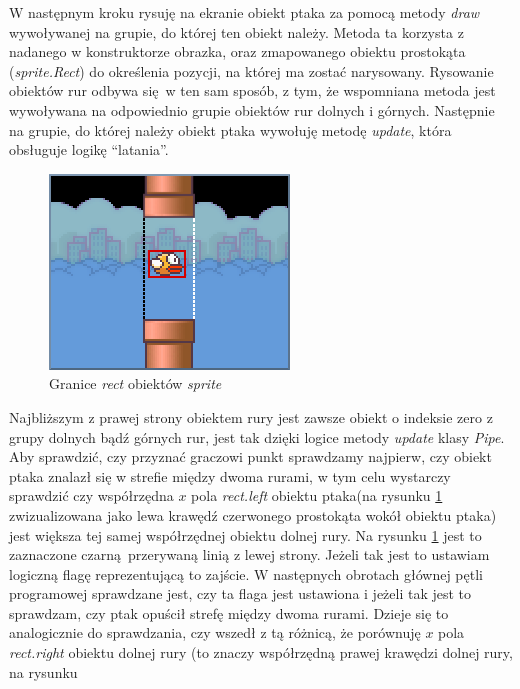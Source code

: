 \documentclass[a4paper,12pt,oneside]{book}
\begin{document}
W następnym kroku rysuję na ekranie obiekt ptaka za pomocą metody \textit{draw}
wywoływanej na grupie, do której ten obiekt należy. Metoda ta korzysta z
nadanego w konstruktorze obrazka, oraz zmapowanego obiektu prostokąta
(\textit{sprite.Rect}) do określenia pozycji, na której ma zostać
narysowany\cite{pygame_group_draw_documentation}. Rysowanie obiektów rur odbywa
się w ten sam sposób, z tym, że wspomniana metoda jest wywoływana na
odpowiednio grupie obiektów rur dolnych i górnych. Następnie na grupie, do
której należy obiekt ptaka wywołuję metodę \textit{update}, która obsługuje
logikę ``latania''.

\begin{figure} 
	\begin{center}
		\includegraphics[scale=1.10]{flappy_scoring.png}
		\caption{Granice \textit{rect} obiektów \textit{sprite}}
		\label{flappy_scoring_fig}
	\end{center}
\end{figure}
Najbliższym z prawej strony obiektem rury jest zawsze obiekt o indeksie zero
z grupy dolnych bądź górnych rur, jest tak dzięki logice metody \textit{update}
klasy \textit{Pipe}. Aby sprawdzić, czy przyznać graczowi punkt sprawdzamy
najpierw, czy obiekt ptaka znalazł się w strefie między dwoma rurami, w tym
celu wystarczy sprawdzić czy współrzędna $x$ pola \textit{rect.left} obiektu
ptaka(na rysunku \ref{flappy_scoring_fig} zwizualizowana jako lewa krawędź
czerwonego prostokąta wokół obiektu ptaka) jest większa tej samej współrzędnej
obiektu dolnej rury. Na rysunku \ref{flappy_scoring_fig} jest to zaznaczone
czarną przerywaną linią z lewej strony. Jeżeli tak jest to ustawiam logiczną
flagę reprezentującą to zajście.
W następnych obrotach głównej pętli programowej sprawdzane jest, czy ta flaga
jest ustawiona i jeżeli tak jest to sprawdzam, czy ptak opuścił strefę między
dwoma rurami. Dzieje się to analogicznie do sprawdzania, czy wszedł z tą
różnicą, że porównuję $x$ pola \textit{rect.right} obiektu dolnej rury (to
znaczy współrzędną prawej krawędzi dolnej rury, na rysunku
\end{document}

